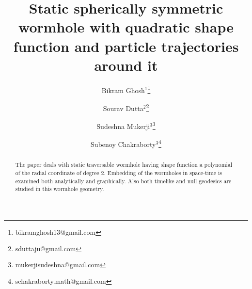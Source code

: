\documentclass[10pt]{revtex4}
\begin{document}
\title{Static spherically symmetric wormhole with quadratic shape function and particle trajectories around it}
\author{Bikram Ghosh$^1$\footnote {bikramghosh13@gmail.com}}
\author{Sourav Dutta$^2$\footnote {sduttaju@gmail.com}}
\author{Sudeshna Mukerji$^3$\footnote {mukerjisudeshna@gmail.com}}
\author{Subenoy Chakraborty$^3$\footnote {schakraborty.math@gmail.com}}


	
\begin{abstract} The paper deals with static traversable wormhole having shape function a polynomial of the radial coordinate of degree 2. Embedding of the wormholes in space-time is examined both analytically and graphically. Also both timelike and null geodesics are studied in this wormhole geometry.
\end{abstract}
\maketitle
\end{document}
